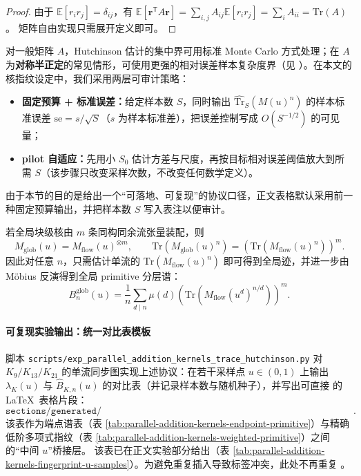 \begin{proof}
由于 $\mathbb{E}[r_ir_j]=\delta_{ij}$，有
\(
\mathbb{E}[\mathbf r^{\mathsf T}A\mathbf r]=\sum_{i,j}A_{ij}\mathbb{E}[r_ir_j]=\sum_i A_{ii}=\mathrm{Tr}(A)
\)。
矩阵自由实现只需展开定义即可。
\end{proof}

\begin{remark}[误差口径与样本数选择]\label{rem:hutchinson-error}
对一般矩阵 $A$，Hutchinson 估计的集中界可用标准 Monte Carlo 方式处理；在 $A$ 为\textbf{对称半正定}的常见情形，可使用更强的相对误差样本复杂度界（见 \cite{Hutchinson1989ASE,AvronToledo2011Trace}）。在本文的核指纹设定中，我们采用两层可审计策略：
\begin{itemize}
  \item \textbf{固定预算 + 标准误差：}给定样本数 $S$，同时输出 $\widehat{\mathrm{Tr}}_S(M(u)^n)$ 的样本标准误差 $\mathrm{se}=s/\sqrt{S}$（$s$ 为样本标准差），把误差控制写成 $O(S^{-1/2})$ 的可见量；
  \item \textbf{pilot 自适应：}先用小 $S_0$ 估计方差与尺度，再按目标相对误差阈值放大到所需 $S$（该步骤只改变采样次数，不改变任何数学定义）。
\end{itemize}
由于本节的目的是给出一个“可落地、可复现”的协议口径，正文表格默认采用前一种固定预算输出，并把样本数 $S$ 写入表注以便审计。
\end{remark}

\begin{proposition}\label{prop:hutchinson-global-lift}
若全局块级核由 $m$ 条同构同余流张量装配，则
\[
M_{\mathrm{glob}}(u)=M_{\mathrm{flow}}(u)^{\otimes m},
\qquad
\mathrm{Tr}\!\left(M_{\mathrm{glob}}(u)^n\right)=\left(\mathrm{Tr}\!\left(M_{\mathrm{flow}}(u)^n\right)\right)^m.
\]
因此对任意 $n$，只需估计单流的 $\mathrm{Tr}(M_{\mathrm{flow}}(u)^n)$ 即可得到全局迹，并进一步由 Möbius 反演得到全局 primitive 分层谱：
\[
B^{\mathrm{glob}}_{n}(u)=\frac{1}{n}\sum_{d\mid n}\mu(d)\left(\mathrm{Tr}\!\left(M_{\mathrm{flow}}(u^d)^{n/d}\right)\right)^m.
\]
\end{proposition}

\paragraph{可复现实验输出：统一对比表模板}
脚本 \texttt{scripts/exp\_parallel\_addition\_kernels\_trace\_hutchinson.py} 对 $K_9/K_{13}/K_{21}$ 的单流同步图实现上述协议：在若干采样点 $u\in(0,1)$ 上输出 $\lambda_K(u)$ 与 $\widehat B_{K,n}(u)$ 的对比表（并记录样本数与随机种子），并写出可直接 \verb|| 的 \LaTeX\ 表格片段：
\[
\texttt{sections/generated/tab\_parallel\_addition\_kernels\_fingerprint\_u\_samples.tex}.
\]
该表作为端点谱表（表 \ref{tab:parallel-addition-kernels-endpoint-primitive}）与精确低阶多项式指纹（表 \ref{tab:parallel-addition-kernels-weighted-primitive}）之间的“中间 $u$”桥接层。
该表已在正文实验部分给出（表 \ref{tab:parallel-addition-kernels-fingerprint-u-samples}）。为避免重复插入导致标签冲突，此处不再重复 \verb||。

